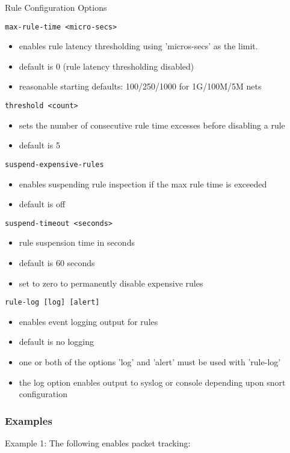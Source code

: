 \documentclass[english]{report}
\begin{document}
Rule Configuration Options

\texttt{max-rule-time <micro-secs>}
\begin{itemize}
\item enables rule latency thresholding using 'micros-secs' as the limit.
\item default is 0 (rule latency thresholding disabled)
\item reasonable starting defaults: 100/250/1000 for 1G/100M/5M nets
\end{itemize}

\texttt{threshold <count>}
\begin{itemize}
\item sets the number of consecutive rule time excesses before disabling
      a rule
\item default is 5
\end{itemize}

\texttt{suspend-expensive-rules}
\begin{itemize}
\item enables suspending rule inspection if the max rule time is exceeded
\item default is off
\end{itemize}

\texttt{suspend-timeout <seconds>}
\begin{itemize}
\item rule suspension time in seconds
\item default is 60 seconds
\item set to zero to permanently disable expensive rules
\end{itemize}

\texttt{rule-log [log] [alert]}
\begin{itemize}
\item enables event logging output for rules
\item default is no logging
\item one or both of the options 'log' and 'alert' must be used with
      'rule-log'
\item the log option enables output to syslog or console depending 
      upon snort configuration
\end{itemize}


\subsubsection{Examples}

Example 1:
The following enables packet tracking:
\end{document}
